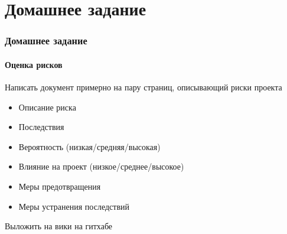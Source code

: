 \documentclass[xetex,mathserif,serif]{beamer}
\begin{document}
	\section{Домашнее задание}
	
	\begin{frame}
		\frametitle{Домашнее задание}
		\framesubtitle{Оценка рисков}
		Написать документ примерно на пару страниц, описывающий риски проекта
		\begin{itemize}
			\item Описание риска
			\item Последствия
			\item Вероятность (низкая/средняя/высокая)
			\item Влияние на проект (низкое/среднее/высокое)
			\item Меры предотвращения
			\item Меры устранения последствий
		\end{itemize}
		Выложить на вики на гитхабе
	\end{frame}
\end{document}
